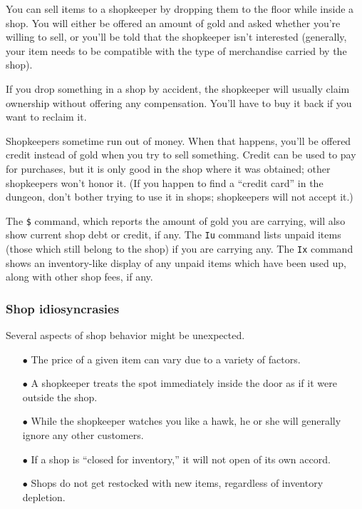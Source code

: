 You can sell items to a shopkeeper by dropping them to the floor while
inside a shop.  You will either be offered an amount of gold and asked
whether you're willing to sell, or you'll be told that the shopkeeper
isn't interested (generally, your item needs to be compatible with the
type of merchandise carried by the shop).

If you drop something in a shop by accident, the shopkeeper will usually
claim ownership without offering any compensation.  You'll have to buy
it back if you want to reclaim it.

Shopkeepers sometime run out of money.
When that happens, you'll be
offered credit instead of gold when you try to sell something.
Credit can be used to pay for purchases, but it is only good in the shop
where it was obtained; other shopkeepers won't honor it.
(If you happen to
find a ``credit card'' in the dungeon, don't bother trying to use it in
shops; shopkeepers will not accept it.)

The {\tt \$} command, which reports the amount of gold you are carrying,
will also show current shop debt or credit, if any.
The {\tt Iu} command lists unpaid items (those which still belong to the
shop) if you are carrying any.
The {\tt Ix} command shows an inventory-like display of any unpaid items
which have been used up, along with other shop fees, if any.

\subsubsection*{Shop idiosyncrasies}

Several aspects of shop behavior might be unexpected.

\begin{itemize}
\item[$\bullet$]
The price of a given item can vary due to a variety of factors.
\item[$\bullet$]
A shopkeeper treats the spot immediately inside the door as if it were
outside the shop.
\item[$\bullet$]
While the shopkeeper watches you like a hawk, he or she will generally ignore
any other customers.
\item[$\bullet$]
If a shop is ``closed for inventory,'' it will not open of its own accord.
\item[$\bullet$]
Shops do not get restocked with new items, regardless of inventory depletion.
\end{itemize}

